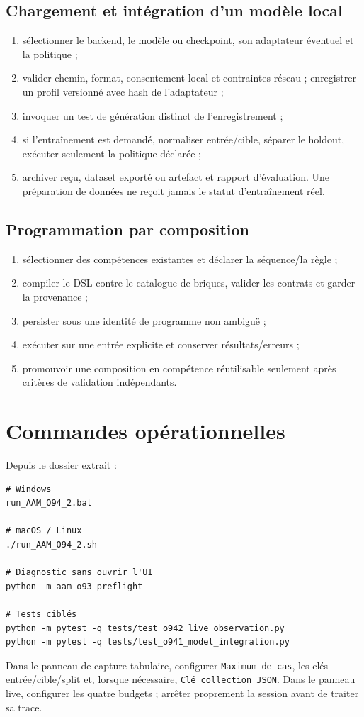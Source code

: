 \documentclass[11pt,a4paper]{article}
\begin{document}
\subsection{Chargement et intégration d'un modèle local}
\begin{enumerate}[leftmargin=1.5em]
  \item sélectionner le backend, le modèle ou checkpoint, son adaptateur éventuel et la politique ;
  \item valider chemin, format, consentement local et contraintes réseau ; enregistrer un profil versionné avec hash de l'adaptateur ;
  \item invoquer un test de génération distinct de l'enregistrement ;
  \item si l'entraînement est demandé, normaliser entrée/cible, séparer le holdout, exécuter seulement la politique déclarée ;
  \item archiver reçu, dataset exporté ou artefact et rapport d'évaluation. Une préparation de données ne reçoit jamais le statut d'entraînement réel.
\end{enumerate}

\subsection{Programmation par composition}
\begin{enumerate}[leftmargin=1.5em]
  \item sélectionner des compétences existantes et déclarer la séquence/la règle ;
  \item compiler le DSL contre le catalogue de briques, valider les contrats et garder la provenance ;
  \item persister sous une identité de programme non ambiguë ;
  \item exécuter sur une entrée explicite et conserver résultats/erreurs ;
  \item promouvoir une composition en compétence réutilisable seulement après critères de validation indépendants.
\end{enumerate}

\section{Commandes opérationnelles}
Depuis le dossier extrait :
\begin{verbatim}
# Windows
run_AAM_O94_2.bat

# macOS / Linux
./run_AAM_O94_2.sh

# Diagnostic sans ouvrir l'UI
python -m aam_o93 preflight

# Tests ciblés
python -m pytest -q tests/test_o942_live_observation.py
python -m pytest -q tests/test_o941_model_integration.py
\end{verbatim}
Dans le panneau de capture tabulaire, configurer \verb|Maximum de cas|, les clés entrée/cible/split et, lorsque nécessaire, \verb|Clé collection JSON|. Dans le panneau live, configurer les quatre budgets ; arrêter proprement la session avant de traiter sa trace.
\end{document}
